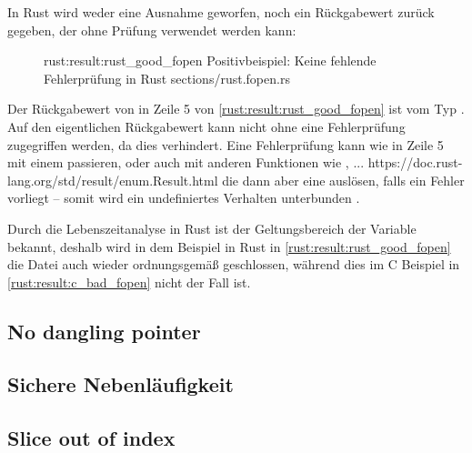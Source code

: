 In Rust wird weder eine Ausnahme geworfen, noch ein Rückgabewert zurück gegeben, der ohne Prüfung verwendet werden kann:

\begin{figure}[H]
	\rustcinclude
	{rust:result:rust_good_fopen}
	{Positivbeispiel: Keine fehlende Fehlerprüfung in Rust}
	{sections/rust.fopen.rs}
\end{figure}

Der Rückgabewert von  in Zeile 5 von \autoref{rust:result:rust_good_fopen} ist vom Typ .
Auf den eigentlichen Rückgabewert  kann nicht ohne eine Fehlerprüfung zugegriffen werden, da dies  verhindert.
Eine Fehlerprüfung kann wie in Zeile 5 mit einem  passieren, oder auch mit anderen Funktionen wie ,  ... https://doc.rust-lang.org/std/result/enum.Result.html die dann aber eine   auslösen, falls ein Fehler vorliegt -- somit wird ein undefiniertes Verhalten unterbunden .

Durch die Lebenszeitanalyse  in Rust ist der Geltungsbereich der  Variable bekannt, deshalb wird in dem Beispiel in Rust in \autoref{rust:result:rust_good_fopen} die Datei auch wieder ordnungsgemäß geschlossen, während dies im C Beispiel in \autoref{rust:result:c_bad_fopen} nicht der Fall ist.


\subsection{No dangling pointer}

\subsection{Sichere Nebenläufigkeit}





\subsection{Slice out of index}

